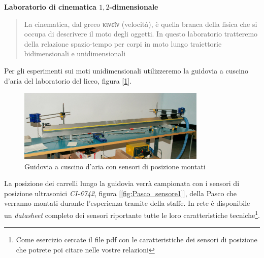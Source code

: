 \documentclass[a4paper,10pt,oneside]{article}
\begin{document}
\begin{center}
\begin{doublespace}
 {\huge \textbf{Laboratorio di cinematica $1,2$-dimensionale}}
\end{doublespace}
\end{center}

\begin{abstract}
 La cinematica, dal greco \textgreek{κινεῖν} (velocità), è quella branca della fisica che si occupa di descrivere il moto degli oggetti. In questo laboratorio tratteremo della relazione spazio-tempo per corpi in moto lungo traiettorie bidimensionali e unidimensionali
\end{abstract}


\vspace{1.5cm}

Per gli esperimenti sui moti unidimensionali utilizzeremo la guidovia a cuscino d'aria del laboratorio del liceo, figura [\ref{fig:guidovia_cuscino}].

\begin{figure}[H]
 \centering
 \includegraphics[width=0.8\textwidth]{./Immagini/guidovia.jpg}
 \caption{Guidovia a cuscino d'aria con sensori di posizione montati}
 \label{fig:guidovia_cuscino}
\end{figure}

La posizione dei carrelli lungo la guidovia verrà  campionata con i sensori di posizione ultrasonici  \textsl{CI-6742}, figura [\ref{fig:Pasco_sensore1}], della Pasco che verranno montati durante l'esperienza tramite della staffe. In rete è disponibile un \emph{datasheet} completo dei sensori riportante tutte le loro caratteristiche tecniche\footnote{Come esercizio cercate il file pdf con le caratteristiche dei sensori di posizione che potrete poi citare nelle vostre relazioni}.
\end{document}
